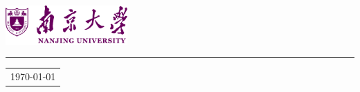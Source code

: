 \documentclass{article}
\begin{document}

\includegraphics[width=0.35\textwidth]{njulogo} %

\vspace{-1em} %

\rule{\linewidth}{1pt} %



\hfill
\begin{tabular}{l @{}}
\hfill \today \bigskip\\ %
\end{tabular}

\bigskip %



\end{document}
